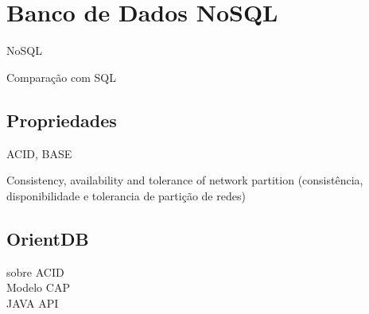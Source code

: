 \chapter{Banco de Dados NoSQL}

\indent NoSQL

\indent Comparação com SQL \\

\section{Propriedades}

\indent ACID, BASE %

\indent Consistency, availability and tolerance of network partition (consistência, disponibilidade e tolerancia de partição de redes) %

\section{OrientDB}


\indent sobre ACID \\

\indent Modelo CAP \\


\indent JAVA API \\
